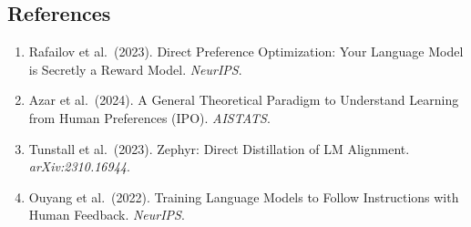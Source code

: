 \documentclass{article}
\begin{document}
\subsection*{References}

\begin{enumerate}
  \item Rafailov et al.\ (2023). Direct Preference Optimization: Your Language Model is Secretly a Reward Model. \textit{NeurIPS}.
  \item Azar et al.\ (2024). A General Theoretical Paradigm to Understand Learning from Human Preferences (IPO). \textit{AISTATS}.
  \item Tunstall et al.\ (2023). Zephyr: Direct Distillation of LM Alignment. \textit{arXiv:2310.16944}.
  \item Ouyang et al.\ (2022). Training Language Models to Follow Instructions with Human Feedback. \textit{NeurIPS}.
\end{enumerate}
\end{document}
